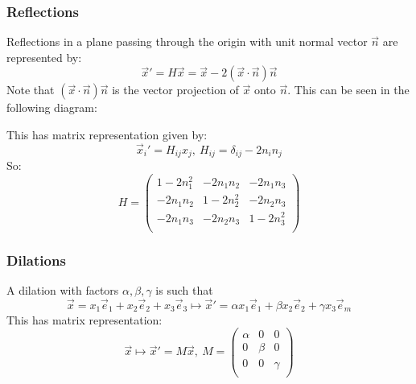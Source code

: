 \documentclass[../main.tex]{subfiles}
\begin{document}
\subsubsection{Reflections}
Reflections in a plane passing through the origin with unit normal vector $\vec{n}$ are represented by:
\[
  \vec{x}' = H\vec{x} = \vec{x} - 2(\vec{x} \cdot \vec{n})\vec{n}
\]
Note that $(\vec{x} \cdot \vec{n})\vec{n}$ is the vector projection of $\vec{x}$ onto $\vec{n}$.
This can be seen in the following diagram:
\begin{center}
\end{center}
This has matrix representation given by:
\[
  \vec{x}_i' = H_{i j}x_j,\ H_{i j} = \delta_{i j} - 2n_in_j
\]
So:
\[
  H = \begin{pmatrix}
  1-2n^{2}_{1} & -2n_1n_2 & -2n_1n_3 \\
  -2n_1n_2 & 1-2n^{2}_{2} & -2n_2n_3 \\
  -2n_1n_3 & -2n_2n_3 & 1-2n^{2}_{3} \\
  \end{pmatrix}
\]
\subsubsection{Dilations}
A dilation with factors $\alpha, \beta, \gamma$ is such that
\[
  \vec{x} = x_1 \vec{e}_1 + x_2 \vec{e}_2 + x_3 \vec{e}_3 \mapsto \vec{x}' = \alpha x_1 \vec{e}_1 + \beta x_2 \vec{e}_2 + \gamma x_3 \vec{e}_m
\]
This has matrix representation:
\[
  \vec{x} \mapsto \vec{x}' = M\vec{x},\
  M = \begin{pmatrix}
  \alpha & 0 & 0 \\
  0 & \beta & 0 \\
  0 & 0 & \gamma \\
  \end{pmatrix}
\]
\end{document}
